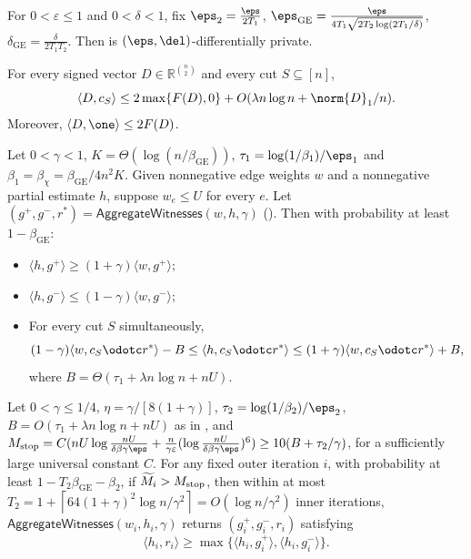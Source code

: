 \begin{lemma}\label{lem:main-privacy}
For $0<\varepsilon\leq1$ and $0<\delta<1$, fix $\eps_2=\frac{\eps}{2T_1}$, $\eps_{\mathrm{GE}}=\frac{\eps}{4T_1\sqrt{2T_2\log(2T_1/\delta)}}$, $\delta_{\mathrm{GE}}=\frac{\delta}{2T_1T_2}.$
Then  is
$(\eps, \del)$-differentially private.
\end{lemma}

\begin{lemma}\label{lem:sdp_error}
For every signed vector $D \in \mathbb{R}^{\binom{n}{2}}$ and every cut $S \subseteq [n]$,
\[\langle D, c_S\rangle\leq 2\max\{F(D),0\}+O(\lambda n\log n+\norm{D}_1/n).\]
Moreover, $\langle D,\one\rangle\leq2F(D)$.
\end{lemma}

\begin{lemma}\label{lem:gradient_estimation}
Let $0<\gamma<1$, $K=\Theta(\log(n/\beta_{\mathrm{GE}}))$, $\tau_1=\log(1/\beta_1)/\eps_1$ and $\beta_1=\beta_{\chi}=\beta_{\mathrm{GE}}/4n^2K$. Given nonnegative edge weights $w$ and a nonnegative partial estimate $h$, suppose $w_e\leq U$ for every $e$. Let $(g^+,g^-,r^*)=\mathsf{AggregateWitnesses}(w,h,\gamma)$ ().
Then with probability at least $1-\beta_{\mathrm{GE}}$:
\begin{itemize}
    \item $\langle h,g^+\rangle\geq(1+\gamma)\langle w,g^+\rangle;$
    \item $\langle h,g^-\rangle\leq(1-\gamma)\langle w,g^-\rangle;$
    \item For every cut $S$ simultaneously, \[(1-\gamma)\langle w,c_S\odotc r^*\rangle-B\leq \langle h,c_S\odotc r^*\rangle\leq(1+\gamma)\langle w,c_S\odotc r^*\rangle+B,\]
where $B=\Theta\left(\tau_1+\lambda n\log n+nU\right).$
\end{itemize}
\end{lemma}

\begin{lemma}\label{lem:inner_round}
Let $0 < \gamma \leq 1/4$, $\eta=\gamma/[8(1+\gamma)]$, $\tau_2=\log(1/\beta_2)/\eps_2$,
$B=O(\tau_1+\lambda n\log n+nU)$ as in , and
$M_{\mathrm{stop}}=C(nU\log\frac{nU}{\delta\beta\gamma\eps}+\frac{n}{\gamma\varepsilon}(\log\frac{nU}{\delta\beta\gamma\eps})^6)\geq10(B+\tau_2/\gamma)$, for a sufficiently large universal constant $C$.
For any fixed outer iteration $i$, with probability at least $1-T_2\beta_{\mathrm{GE}}-\beta_2$, if $\widetilde M_i>M_{\rm stop}$, then within at most $T_2=1+\left\lceil64(1+\gamma)^2\log n/\gamma^2\right\rceil=O(\log n/\gamma^2)$ inner iterations, $\mathsf{AggregateWitnesses}(w_i,h_i,\gamma)$ returns $(g^+_i,g^-_i,r_i)$ satisfying
\[
\langle h_i,r_i\rangle\geq\max\{\langle h_i,g^+_i\rangle,\langle h_i,g^-_i\rangle\}.
\]
\end{lemma}

